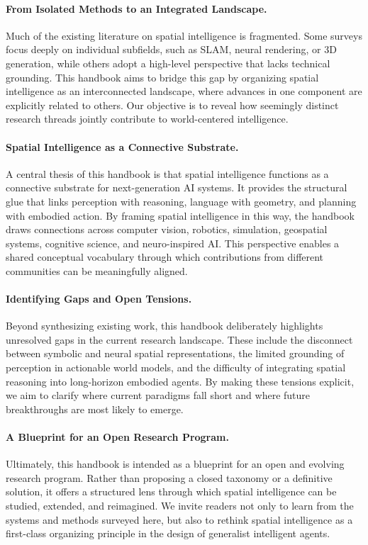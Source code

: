 \paragraph{From Isolated Methods to an Integrated Landscape.}
Much of the existing literature on spatial intelligence is fragmented.
Some surveys focus deeply on individual subfields, such as SLAM, neural rendering, or 3D generation, while others adopt a high-level perspective that lacks technical grounding.
This handbook aims to bridge this gap by organizing spatial intelligence as an interconnected landscape, where advances in one component are explicitly related to others.
Our objective is to reveal how seemingly distinct research threads jointly contribute to world-centered intelligence.

\paragraph{Spatial Intelligence as a Connective Substrate.}
A central thesis of this handbook is that spatial intelligence functions as a connective substrate for next-generation AI systems.
It provides the structural glue that links perception with reasoning, language with geometry, and planning with embodied action.
By framing spatial intelligence in this way, the handbook draws connections across computer vision, robotics, simulation, geospatial systems, cognitive science, and neuro-inspired AI.
This perspective enables a shared conceptual vocabulary through which contributions from different communities can be meaningfully aligned.

\paragraph{Identifying Gaps and Open Tensions.}
Beyond synthesizing existing work, this handbook deliberately highlights unresolved gaps in the current research landscape.
These include the disconnect between symbolic and neural spatial representations, the limited grounding of perception in actionable world models, and the difficulty of integrating spatial reasoning into long-horizon embodied agents.
By making these tensions explicit, we aim to clarify where current paradigms fall short and where future breakthroughs are most likely to emerge.

\paragraph{A Blueprint for an Open Research Program.}
Ultimately, this handbook is intended as a blueprint for an open and evolving research program.
Rather than proposing a closed taxonomy or a definitive solution, it offers a structured lens through which spatial intelligence can be studied, extended, and reimagined.
We invite readers not only to learn from the systems and methods surveyed here, but also to rethink spatial intelligence as a first-class organizing principle in the design of generalist intelligent agents.



